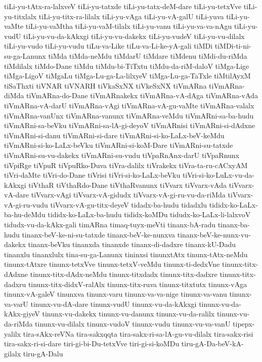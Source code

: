 {tiLi-yu-tAtx-ra-lalxveV
tiLi-yu-tatxde
tiLi-yu-tatx-deM-dare
tiLi-yu-tetxVve
tiLi-yu-titxlalx
tiLi-yu-titx-ra-lilalx
tiLi-yu-vAga
tiLi-yu-vA-galU
tiLi-yuva
tiLi-yu-vaMte
tiLi-yu-vaMtha
tiLi-yu-vaM-tilalx
tiLi-yu-vanu
tiLi-yu-va-va-nAgu
tiLi-yu-vudU
tiLi-yu-vu-da-kAkxgi
tiLi-yu-vu-dakekx
tiLi-yu-vudeV
tiLi-yu-vu-dilalx
tiLi-yu-vudo
tiLi-yu-vudu
tiLu-va-Like
tiLu-va-Li-ke-yA-gali
tiMDi
tiMDi-ti-ni-su-ga-Lanunx
tiMda
tiMda-neMdu
tiMdarU
tiMdare
tiMdenu
tiMdi-du-riMda
tiMdilalx
tiMdo-Dane
tiMdu
tiMdu-bi-TiTxtu
tiMdu-da-riM-daloV
tiMga-Lige
tiMga-LigoV
tiMgaLu
tiMga-Lu-ga-La-lilxyeV
tiMga-Lu-ga-TaTxle
tiMtilAyxM
tiSaThxti
tiVNAR
tiVNARH
tiVkaSxNX
tiVkeSxNX
tiVmARna
tiVmARna-diMda
tiVmARna-do-Dane
tiVmARnakekx
tiVmARna-vA-dAga
tiVmARna-vAda
tiVmARna-vA-darU
tiVmARna-vAgi
tiVmARna-vA-gu-vaMte
tiVmARna-valalx
tiVmARna-vanUnx
tiVmARna-vanunx
tiVmARna-veMdu
tiVmARni-sa-ba-hudu
tiVmARni-sa-beVku
tiVmARni-sa-lA-gi-deyoV
tiVmARnisi
tiVmARni-si-dAdxne
tiVmARni-si-danu
tiVmARni-si-dare
tiVmARni-si-ko-LaLx-beV-keMdu
tiVmARni-si-ko-LaLx-beVku
tiVmARni-si-koM-Dare
tiVmARni-su-tatxde
tiVmARni-su-vu-dakekx
tiVmARni-su-vudu
tiVpaRnAnx-darU
tiVpaRnunx
tiVpiRge
tiVpuR
tiVpuRko-Duva
tiVra-dalilx
tiVrakekx
tiVra-ta-ru-cACxyAM
tiVri-daMte
tiVri-do-Dane
tiVrisi
tiVri-si-ko-LaLx-beVku
tiVri-si-ko-LuLx-vu-da-kAkxgi
tiVthaR
tiVthaRdo-Dane
tiVthaRvanunx
tiVvarx
tiVvarx-vAda
tiVvarx-vA-dare
tiVvarx-vAgi
tiVvarx-vA-gidudx
tiVvarx-vA-gi-ru-vu-da-riMda
tiVvarx-vA-gi-ru-vudu
tiVvarx-vA-gu-titx-deyeV
tidadx-ba-hudu
tidadxlu
tididx-ko-LaLx-ba-hu-deMdu
tididx-ko-LaLx-ba-hudu
tididx-koMDu
tidudx-ko-LaLx-li-lalxvoV
tidudx-vu-da-kAkx-gali
timARna
timaq-tuyx-meVti
tinanx-bA-radu
tinanx-ba-hudu
tinanx-beV-ke-ni-su-tatxde
tinanx-beV-ke-nunxva
tinanx-beV-ke-nunx-vu-dakekx
tinanx-beVku
tinanxda
tinanxde
tinanx-di-dadxre
tinanx-kU-Dadu
tinanxlu
tinanxlulx
tina-su-ga-Lanunx
tininxsi
tinunxtAtx
tinunx-tAtx-neMdu
tinunx-tAtxre
tinunx-tetxVve
tinunx-tetxV-veMdu
tinunx-ti-dedxVne
tinunx-titx-dAdxne
tinunx-titx-dAdx-neMdu
tinunx-titxdadx
tinunx-titx-dadxre
tinunx-titx-dadxru
tinunx-titx-didxV-ralAlx
tinunx-titx-ruva
tinunx-titxtutx
tinunx-vAga
tinunx-vA-galeV
tinunxva
tinunx-varu
tinunx-va-va-nige
tinunx-va-vanu
tinunx-va-varU
tinunx-vu-dA-dare
tinunx-vudU
tinunx-vu-da-kAkxgi
tinunx-vu-da-kAkx-giyeV
tinunx-vu-dakekx
tinunx-vu-danunx
tinunx-vu-da-ralilx
tinunx-vu-da-riMda
tinunx-vu-dilalx
tinunx-vudoV
tinunx-vudu
tinunx-vu-va-vanU
tipepx-yalilx
tira-sAkx-reVNa
tira-sakxqqta
tira-sakx-ri-sa-lA-gu-vu-dilalx
tira-sakx-risi
tira-sakx-ri-si-dare
tiri-gi-bi-Du-tetxVve
tiri-gi-si-koMDu
tiru-gA-Da-beV-kA-gilalx
tiru-gA-Dalu
}
